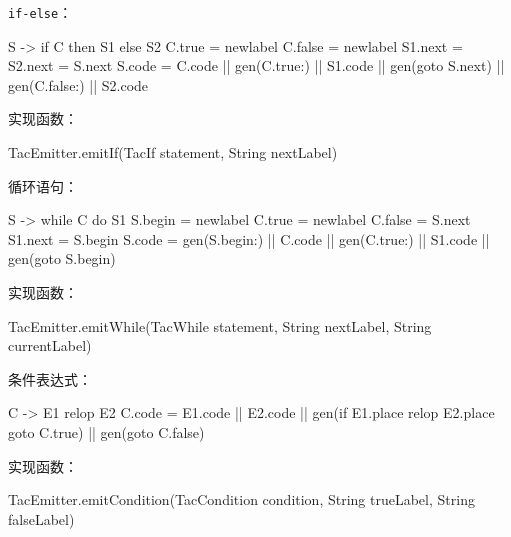 \documentclass[
  a4paper,
  fontset=none,
]{ctexart}
\newenvironment{Shaded}{}{}
\newcommand{\NormalTok}[1]{#1}
\begin{document}
\texttt{if-else}：

\begin{Shaded}
\begin{Highlighting}[]
\NormalTok{S {-}\textgreater{} if C then S1 else S2}
\NormalTok{C.true = newlabel}
\NormalTok{C.false = newlabel}
\NormalTok{S1.next = S2.next = S.next}
\NormalTok{S.code = C.code || gen(C.true:) || S1.code}
\NormalTok{       || gen(goto S.next) || gen(C.false:) || S2.code}
\end{Highlighting}
\end{Shaded}

实现函数：

\begin{Shaded}
\begin{Highlighting}[]
\NormalTok{TacEmitter.emitIf(TacIf statement, String nextLabel)}
\end{Highlighting}
\end{Shaded}

循环语句：

\begin{Shaded}
\begin{Highlighting}[]
\NormalTok{S {-}\textgreater{} while C do S1}
\NormalTok{S.begin = newlabel}
\NormalTok{C.true = newlabel}
\NormalTok{C.false = S.next}
\NormalTok{S1.next = S.begin}
\NormalTok{S.code = gen(S.begin:) || C.code || gen(C.true:) || S1.code || gen(goto S.begin)}
\end{Highlighting}
\end{Shaded}

实现函数：

\begin{Shaded}
\begin{Highlighting}[]
\NormalTok{TacEmitter.emitWhile(TacWhile statement, String nextLabel, String currentLabel)}
\end{Highlighting}
\end{Shaded}

条件表达式：

\begin{Shaded}
\begin{Highlighting}[]
\NormalTok{C {-}\textgreater{} E1 relop E2}
\NormalTok{C.code = E1.code || E2.code}
\NormalTok{       || gen(if E1.place relop E2.place goto C.true)}
\NormalTok{       || gen(goto C.false)}
\end{Highlighting}
\end{Shaded}

实现函数：

\begin{Shaded}
\begin{Highlighting}[]
\NormalTok{TacEmitter.emitCondition(TacCondition condition, String trueLabel, String falseLabel)}
\end{Highlighting}
\end{Shaded}
\end{document}
